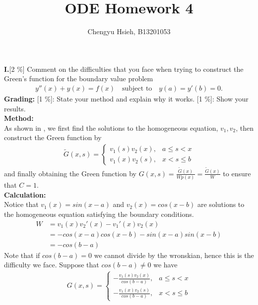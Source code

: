 \documentclass[A4paper,12pt]{article}
\title{ODE Homework 4}
\author{Chengyu Hsieh, B13201053}
\date{}
\theoremstyle{definition}
\numberwithin{equation}{section}
\begin{document}
\maketitle
\textbf{I.}[2 \%] Comment on the difficulties that you face when
trying to construct the Green's function for the boundary value
problem
\begin{align*}
y''(x)+y(x)=f(x) \quad \text{subject to} \quad y(a)=y'(b)=0.
\end{align*}
\textbf{Grading:}
[1 \%]: State your method and explain why it works.
[1 \%]: Show your results.
\\
\textbf{Method: }\\
As shown in \cite{textbook}, we first find the solutions to the homogeneous equation, $v_1, v_2$, then construct the Green function by \begin{align*}
    \tilde{G}(x, s) = \begin{cases}
        v_1(s)v_2(x), &a \le s < x \\
        v_1(x)v_2(s), &x < s \le b
    \end{cases}
\end{align*}
and finally obtaining the Green function by $G(x, s) = \frac{\tilde{G}(x)}{Wp(x)} = \frac{\tilde{G}(x)}{W}$ to ensure that $C = 1$. 
\\
\textbf{Calculation: }\\
Notice that $v_1(x) = sin(x-a)$ and $v_2(x) = cos(x-b)$ are solutions to the homogeneous equation satisfying the boundary conditions.
\begin{align*}
    W &= v_1(x)v_2'(x) - v_1'(x)v_2(x) \\
    &= -cos(x-a)cos(x-b) - sin(x-a)sin(x-b) \\
    &= -cos(b-a)
\end{align*}
Note that if $cos(b-a) = 0$ we cannot divide by the wronskian, hence this is the difficulty we face.
Suppose that $cos(b-a) \neq 0$ we have \begin{align*}
    G(x, s) = \begin{cases}
        -\frac{v_1(s)v_2(x)}{cos(b-a)}, &a \le s < x \\
        -\frac{v_1(x)v_2(s)}{cos(b-a)}, &x < s \le b
    \end{cases}
\end{align*}
\end{document}
